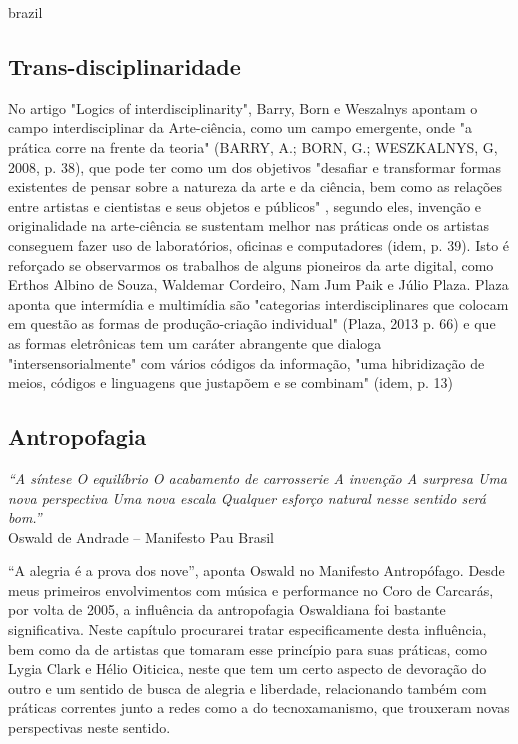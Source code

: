 \begin{otherlanguage*}{brazil}
\subsection{Trans-disciplinaridade}
No artigo "Logics of interdisciplinarity", Barry, Born e Weszalnys apontam o campo interdisciplinar da Arte-ciência, como um campo emergente, onde "a prática corre na frente da teoria" (BARRY, A.; BORN, G.; WESZKALNYS, G, 2008, p. 38), que pode ter como um dos objetivos "desafiar e transformar formas existentes de pensar sobre a natureza da arte e da ciência, bem como as relações entre artistas e cientistas e seus objetos e públicos" , segundo eles, invenção e originalidade na arte-ciência se sustentam melhor nas práticas onde os artistas conseguem fazer uso de laboratórios, oficinas e computadores (idem, p. 39). Isto é reforçado se observarmos os trabalhos de alguns pioneiros da arte digital, como Erthos Albino de Souza, Waldemar Cordeiro, Nam Jum Paik e Júlio Plaza. 
Plaza aponta que intermídia e multimídia são "categorias interdisciplinares  que colocam em questão as formas de produção-criação individual"  (Plaza, 2013 p. 66) e que as formas eletrônicas tem um caráter abrangente que dialoga "intersensorialmente" com vários códigos da informação, "uma hibridização de meios, códigos e linguagens que justapõem e se combinam" (idem, p. 13)

\subsection{Antropofagia}

    \begin{flushright}
        \textit{``A síntese
O equilíbrio
O acabamento de carrosserie
A invenção
A surpresa
Uma nova perspectiva
Uma nova escala
Qualquer esforço natural nesse sentido será bom.''} \\
Oswald de Andrade – Manifesto Pau Brasil    \end{flushright}

``A alegria é a prova dos nove'', aponta Oswald no Manifesto Antropófago. Desde meus primeiros envolvimentos com música e performance no Coro de Carcarás, por volta de 2005, a influência da antropofagia Oswaldiana foi bastante significativa. Neste capítulo procurarei tratar especificamente desta influência, bem como da de artistas que tomaram esse princípio para suas práticas, como Lygia Clark e Hélio Oiticica, neste que tem um certo aspecto de devoração do outro e um sentido de busca de alegria e liberdade, relacionando também com práticas correntes junto a redes como a do tecnoxamanismo, que trouxeram novas perspectivas neste sentido.


\end{otherlanguage*}
